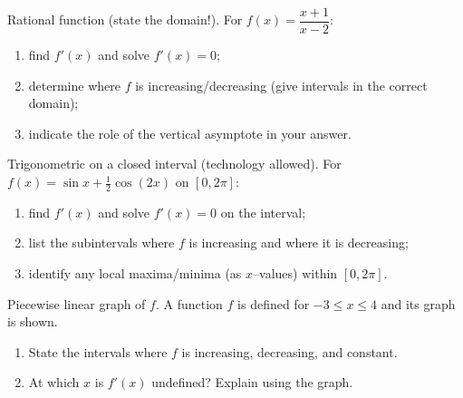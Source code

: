 \documentclass[11pt]{article}
\def\textbf#1{#1}%
\newcounter{question}
\begin{document}
\begin{question}
\textbf{Rational function (state the domain!).}
For $f(x)=\dfrac{x+1}{x-2}$:
\begin{enumerate}
  \item find $f'(x)$ and solve $f'(x)=0$;
  \item determine where $f$ is increasing/decreasing (give intervals in the correct domain);
  \item indicate the role of the vertical asymptote in your answer.
\end{enumerate}
\end{question}

\begin{question}
\textbf{Trigonometric on a closed interval (technology allowed).}
For $f(x)=\sin x+\tfrac12\cos(2x)$ on $[0,2\pi]$:
\begin{enumerate}
  \item find $f'(x)$ and solve $f'(x)=0$ on the interval;
  \item list the subintervals where $f$ is increasing and where it is decreasing;
  \item identify any local maxima/minima (as $x$–values) within $[0,2\pi]$.
\end{enumerate}
\end{question}

\begin{question}
\textbf{Piecewise linear graph of $f$.}
A function $f$ is defined for $-3\le x\le 4$ and its graph is shown.
\begin{enumerate}
  \item State the intervals where $f$ is increasing, decreasing, and constant.
  \item At which $x$ is $f'(x)$ undefined? Explain using the graph.
\end{enumerate}

\begin{center}
\end{center}
\end{question}
\end{document}

